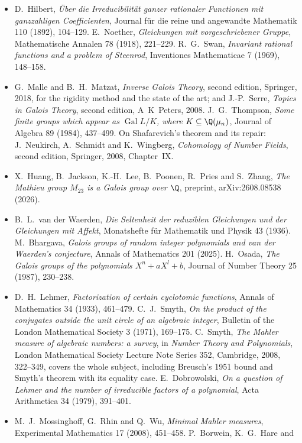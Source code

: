 \begin{itemize}
\item D.~Hilbert, \emph{\"Uber die Irreducibilit\"at ganzer rationaler Functionen mit ganzzahligen Coefficienten}, Journal f\"ur die reine und angewandte
Mathematik 110 (1892), 104--129. E.~Noether, \emph{Gleichungen mit vorgeschriebener Gruppe}, Mathematische Annalen 78 (1918), 221--229. R.~G.~Swan,
\emph{Invariant rational functions and a problem of Steenrod}, Inventiones Mathematicae 7 (1969), 148--158.
\item G.~Malle and B.~H.~Matzat, \emph{Inverse Galois Theory}, second edition, Springer, 2018, for the rigidity method and the state of the art; and
J.-P.~Serre, \emph{Topics in Galois Theory}, second edition, A~K~Peters, 2008. J.~G.~Thompson, \emph{Some finite groups which appear as $\operatorname{Gal}L/K$,
where $K\subseteq\Q(\mu_n)$}, Journal of Algebra 89 (1984), 437--499. On Shafarevich's theorem and its repair: J.~Neukirch, A.~Schmidt and K.~Wingberg,
\emph{Cohomology of Number Fields}, second edition, Springer, 2008, Chapter~IX.
\item X.~Huang, B.~Jackson, K.-H.~Lee, B.~Poonen, R.~Pries and S.~Zhang, \emph{The Mathieu group $M_{23}$ is a Galois group over $\Q$}, preprint,
arXiv:2608.08538 (2026).
\item B.~L.~van der Waerden, \emph{Die Seltenheit der reduziblen Gleichungen und der Gleichungen mit Affekt}, Monatshefte f\"ur Mathematik und Physik 43
(1936). M.~Bhargava, \emph{Galois groups of random integer polynomials and van der Waerden's conjecture}, Annals of Mathematics 201 (2025).
H.~Osada, \emph{The Galois groups of the polynomials $X^n+aX^l+b$}, Journal of Number Theory 25 (1987), 230--238.
\item D.~H.~Lehmer, \emph{Factorization of certain cyclotomic functions}, Annals of Mathematics 34 (1933), 461--479. C.~J.~Smyth, \emph{On the product of
the conjugates outside the unit circle of an algebraic integer}, Bulletin of the London Mathematical Society 3 (1971), 169--175. C.~Smyth,
\emph{The Mahler measure of algebraic numbers: a survey}, in \emph{Number Theory and Polynomials}, London Mathematical Society Lecture Note Series 352,
Cambridge, 2008, 322--349, covers the whole subject, including Breusch's 1951 bound and Smyth's theorem with its equality case. E.~Dobrowolski, \emph{On a
question of Lehmer and the number of irreducible factors of a polynomial}, Acta Arithmetica 34 (1979), 391--401.
\item M.~J.~Mossinghoff, G.~Rhin and Q.~Wu, \emph{Minimal Mahler measures}, Experimental Mathematics 17 (2008), 451--458. P.~Borwein, K.~G.~Hare and

\end{itemize}
